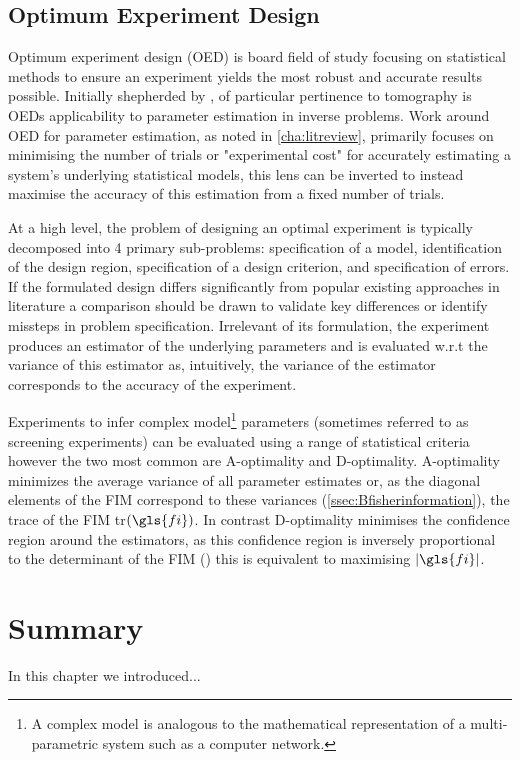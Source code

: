 \subsection{Optimum Experiment Design}
\label{ssec:Boptimumdesigns}

Optimum experiment design (OED) is board field of study focusing on statistical methods to ensure an experiment yields the most robust and accurate results possible. Initially shepherded by \cite{smith_standard_1918}, of particular pertinence to tomography is OEDs applicability to parameter estimation in inverse problems. Work around OED for parameter estimation, as noted in \cref{cha:litreview}, primarily focuses on minimising the number of trials or "experimental cost" for accurately estimating a system's underlying statistical models, this lens can be inverted to instead maximise the accuracy of this estimation from a fixed number of trials.\par
At a high level, the problem of designing an optimal experiment is typically decomposed into 4 primary sub-problems: specification of a model, identification of the design region, specification of a design criterion, and specification of errors. If the formulated design differs significantly from popular existing approaches in literature a comparison should be drawn to validate key differences or identify missteps in problem specification. Irrelevant of its formulation, the experiment produces an estimator of the underlying parameters and is evaluated w.r.t the variance of this estimator as, intuitively, the variance of the estimator corresponds to the accuracy of the experiment.\par
Experiments to infer complex model\footnote{A complex model is analogous to the mathematical representation of a multi-parametric system such as a computer network.} parameters (sometimes referred to as screening experiments) can be evaluated using a range of statistical criteria however the two most common are A-optimality and D-optimality. A-optimality minimizes the average variance of all parameter estimates or, as the diagonal elements of the FIM correspond to these variances (\cref{ssec:Bfisherinformation}), the trace of the FIM tr$\left(\gls{fi}\right)$. In contrast D-optimality minimises the confidence region around the estimators, as this confidence region is inversely proportional to the determinant of the FIM (\cite{jones_-optimal_2021}) this is equivalent to maximising $|\gls{fi}|$.\par

\section{Summary}

In this chapter we introduced...  